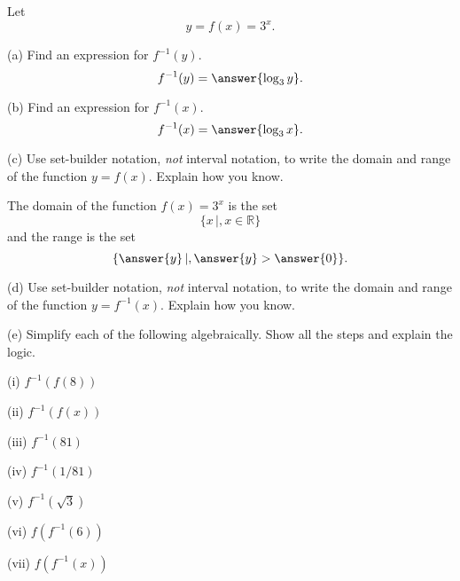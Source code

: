 \documentclass{ximera}
\begin{document}
\begin{question}  \label{Q1:LogF}
Let 
\[
   y =  f(x) = 3^x .
\]

(a) Find an expression for $f^{-1}(y)$.
\[
      f^{-1}(y) = \answer{\log_3 y}.
\]

(b) Find an expression for $f^{-1}(x)$.
\[
   f^{-1}(x) = \answer{\log_3 x}.
\]

(c) Use set-builder notation, \emph{not} interval notation, to write the domain and range of the function $y=f(x)$. Explain how  you know.

The domain of the function $f(x) = 3^x$ is the set
\[
   \{   x \, | , x\in \mathbb{R}  \}
\]
and the range is the set
\[
    \{   \answer{y} \, | , \answer{y} > \answer{0}  \} .
\]

(d) Use set-builder notation, \emph{not} interval notation, to write the domain and range of the function $y=f^{-1}(x)$. Explain how  you know.

(e) Simplify each of the following algebraically. Show all the steps and explain the logic.

(i) $f^{-1}(f(8))$

(ii)  $f^{-1}(f(x))$

(iii) $f^{-1}(81)$

(iv) $f^{-1}(1/81)$

(v) $f^{-1} (\sqrt{3})$

(vi) $f(f^{-1}(6))$

(vii) $f(f^{-1}(x))$


\end{question}
\end{document}
